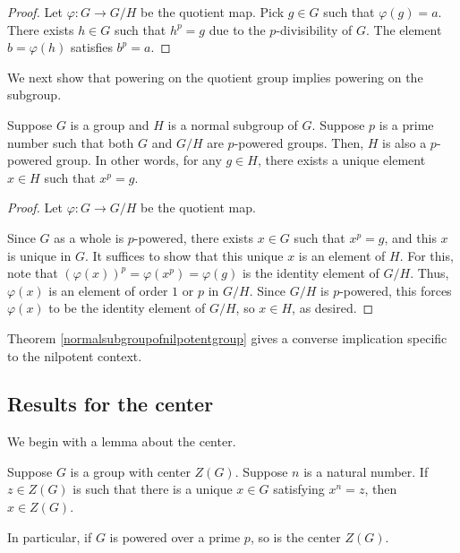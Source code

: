 \documentclass{ucetd}
\begin{document}
\begin{proof}
  Let $\varphi:G \to G/H$ be the quotient map. Pick $g \in G$ such that
  $\varphi(g) = a$. There exists $h \in G$ such that $h^p = g$ due to the
  $p$-divisibility of $G$. The element $b = \varphi(h)$ satisfies $b^p = a$.
\end{proof}

We next show that powering on the quotient group implies powering on
the subgroup.

\begin{lemma}\label{quottosub}
  Suppose $G$ is a group and $H$ is a normal subgroup of $G$. Suppose
  $p$ is a prime number such that both $G$ and $G/H$ are $p$-powered
  groups. Then, $H$ is also a $p$-powered group. In other words, for
  any $g \in H$, there exists a unique element $x \in H$ such that $x^p
  =g$.
\end{lemma}

\begin{proof}
  Let $\varphi:G \to G/H$ be the quotient map.

  Since $G$ as a whole is $p$-powered, there exists $x \in G$ such
  that $x^p = g$, and this $x$ is unique in $G$. It suffices to show
  that this unique $x$ is an element of $H$. For this, note that
  $(\varphi(x))^p = \varphi(x^p) = \varphi(g)$ is the identity element
  of $G/H$. Thus, $\varphi(x)$ is an element of order $1$ or $p$ in
  $G/H$. Since $G/H$ is $p$-powered, this forces $\varphi(x)$ to be
  the identity element of $G/H$, so $x \in H$, as desired.
\end{proof}

Theorem \ref{normalsubgroupofnilpotentgroup} gives a converse
implication specific to the nilpotent context.


\subsection{Results for the center}

We begin with a lemma about the center.

\begin{lemma}\label{lemma:centerispoweringinvariant}
  Suppose $G$ is a group with center $Z(G)$. Suppose $n$ is a natural
  number. If $z \in Z(G)$ is such that there is a unique $x \in G$
  satisfying $x^n = z$, then  $x \in Z(G)$.

  In particular, if $G$ is powered over a prime $p$,
  so is the center $Z(G)$.
\end{lemma}
\end{document}
